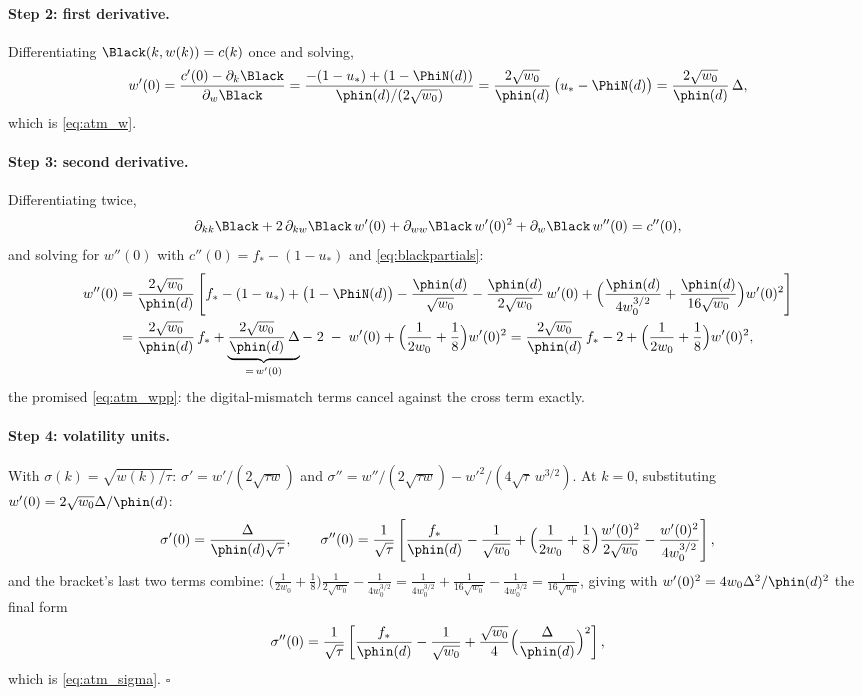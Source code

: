 \paragraph{Step 2: first derivative.}
Differentiating $\Black(k,w(k))=c(k)$ once and solving,
\[
w'(0)=\frac{c'(0)-\partial_k\Black}{\partial_w\Black}
=\frac{-(1-u_*)+(1-\PhiN(d))}{\phin(d)/(2\sqrt{w_0})}
=\frac{2\sqrt{w_0}}{\phin(d)}\,\big(u_*-\PhiN(d)\big)
=\frac{2\sqrt{w_0}}{\phin(d)}\,\Delta,
\]
which is \eqref{eq:atm_w}.

\paragraph{Step 3: second derivative.}
Differentiating twice,
\[
\partial_{kk}\Black+2\,\partial_{kw}\Black\,w'(0)
+\partial_{ww}\Black\,w'(0)^{2}+\partial_w\Black\,w''(0)=c''(0),
\]
and solving for $w''(0)$ with $c''(0)=f_*-(1-u_*)$ and
\eqref{eq:blackpartials}:
\begin{align*}
w''(0)
&=\frac{2\sqrt{w_0}}{\phin(d)}
\left[f_*-(1-u_*)+\big(1-\PhiN(d)\big)-\frac{\phin(d)}{\sqrt{w_0}}
-\frac{\phin(d)}{2\sqrt{w_0}}\,w'(0)
+\Big(\frac{\phin(d)}{4w_0^{3/2}}+\frac{\phin(d)}{16\sqrt{w_0}}\Big)w'(0)^{2}
\right]\\
&=\frac{2\sqrt{w_0}}{\phin(d)}\,f_*
+\underbrace{\frac{2\sqrt{w_0}}{\phin(d)}\,\Delta}_{=\,w'(0)}
-\;2\;-\;w'(0)
+\Big(\frac{1}{2w_0}+\frac18\Big)w'(0)^{2}
=\frac{2\sqrt{w_0}}{\phin(d)}\,f_*-2
+\Big(\frac{1}{2w_0}+\frac18\Big)w'(0)^{2},
\end{align*}
the promised \eqref{eq:atm_wpp}: the digital-mismatch terms cancel
against the cross term exactly.

\paragraph{Step 4: volatility units.}
With $\sigma(k)=\sqrt{w(k)/\tau}$: $\sigma'=w'/(2\sqrt{\tau w})$ and
$\sigma''=w''/(2\sqrt{\tau w})-w'^{2}/(4\sqrt{\tau}\,w^{3/2})$.  At
$k=0$, substituting $w'(0)=2\sqrt{w_0}\Delta/\phin(d)$:
\[
\sigma'(0)=\frac{\Delta}{\phin(d)\sqrt{\tau}},
\qquad
\sigma''(0)
=\frac{1}{\sqrt\tau}\left[
\frac{f_*}{\phin(d)}-\frac{1}{\sqrt{w_0}}
+\Big(\frac{1}{2w_0}+\frac18\Big)\frac{w'(0)^2}{2\sqrt{w_0}}
-\frac{w'(0)^{2}}{4w_0^{3/2}}
\right],
\]
and the bracket's last two terms combine:
$\big(\tfrac{1}{2w_0}+\tfrac18\big)\tfrac{1}{2\sqrt{w_0}}
-\tfrac{1}{4w_0^{3/2}}
=\tfrac{1}{4w_0^{3/2}}+\tfrac{1}{16\sqrt{w_0}}-\tfrac{1}{4w_0^{3/2}}
=\tfrac{1}{16\sqrt{w_0}}$, giving with
$w'(0)^{2}=4w_0\Delta^{2}/\phin(d)^{2}$ the final form
\[
\sigma''(0)=\frac{1}{\sqrt{\tau}}
\left[\frac{f_*}{\phin(d)}-\frac{1}{\sqrt{w_0}}
+\frac{\sqrt{w_0}}{4}\Big(\frac{\Delta}{\phin(d)}\Big)^{2}\right],
\]
which is \eqref{eq:atm_sigma}. \hfill$\square$

